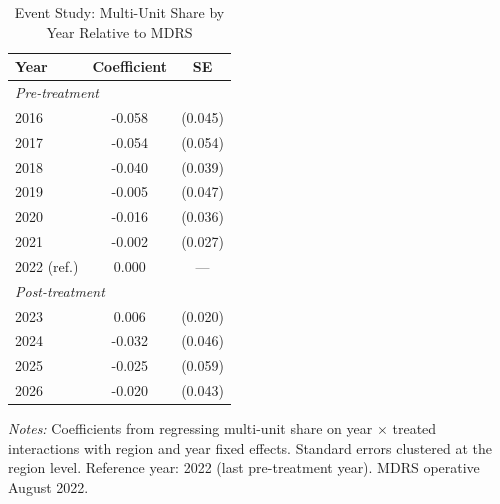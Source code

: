 \begin{table}[H]
\centering
\caption{Event Study: Multi-Unit Share by Year Relative to MDRS}
\label{tab:event}
\begin{threeparttable}
\begin{tabular}{lcc}
\toprule
Year & Coefficient & SE \\
\midrule
\multicolumn{3}{l}{\textit{Pre-treatment}} \\
2016 & -0.058 & (0.045) \\
2017 & -0.054 & (0.054) \\
2018 & -0.040 & (0.039) \\
2019 & -0.005 & (0.047) \\
2020 & -0.016 & (0.036) \\
2021 & -0.002 & (0.027) \\
2022 (ref.) & 0.000 & --- \\
\midrule
\multicolumn{3}{l}{\textit{Post-treatment}} \\
2023 & 0.006 & (0.020) \\
2024 & -0.032 & (0.046) \\
2025 & -0.025 & (0.059) \\
2026 & -0.020 & (0.043) \\
\bottomrule
\end{tabular}
\begin{tablenotes}[flushleft]
\small
\item \textit{Notes:} Coefficients from regressing multi-unit share on year $\times$ treated interactions with region and year fixed effects. Standard errors clustered at the region level. Reference year: 2022 (last pre-treatment year). MDRS operative August 2022.
\end{tablenotes}
\end{threeparttable}
\end{table}

